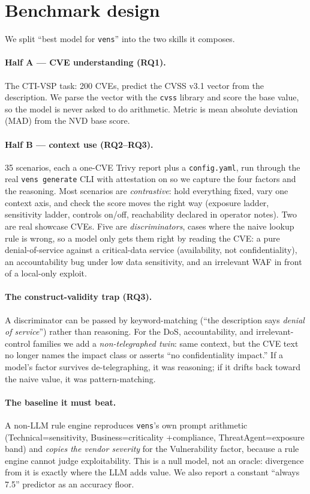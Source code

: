\documentclass[10pt,twocolumn]{article}
\newcommand{\code}[1]{\texttt{\small #1}}
\begin{document}
\section{Benchmark design}
\label{sec:design}
We split ``best model for \code{vens}'' into the two skills it composes.

\paragraph{Half A --- CVE understanding (RQ1).} The CTI-VSP task: 200 CVEs,
predict the CVSS v3.1 vector from the description. We parse the vector with the
\code{cvss} library and score the base value, so the model is never asked to do
arithmetic. Metric is mean absolute deviation (MAD) from the NVD base score.

\paragraph{Half B --- context use (RQ2--RQ3).} 35 scenarios, each a one-CVE
Trivy report plus a \code{config.yaml}, run through the real \code{vens generate}
CLI with attestation on so we capture the four factors and the reasoning. Most
scenarios are \emph{contrastive}: hold everything fixed, vary one context axis,
and check the score moves the right way (exposure ladder, sensitivity ladder,
controls on/off, reachability declared in operator notes). Two are real showcase
CVEs. Five are \emph{discriminators}, cases where the naive lookup rule is
wrong, so a model only gets them right by reading the CVE: a pure
denial-of-service against a critical-data service (availability, not
confidentiality), an accountability bug under low data sensitivity, and an
irrelevant WAF in front of a local-only exploit.

\paragraph{The construct-validity trap (RQ3).} A discriminator can be passed by
keyword-matching (``the description says \emph{denial of service}'') rather than
reasoning. For the DoS, accountability, and irrelevant-control families we add a
\emph{non-telegraphed twin}: same context, but the CVE text no longer names the
impact class or asserts ``no confidentiality impact.'' If a model's factor
survives de-telegraphing, it was reasoning; if it drifts back toward the naive
value, it was pattern-matching.

\paragraph{The baseline it must beat.} A non-LLM rule engine reproduces
\code{vens}'s own prompt arithmetic (Technical=sensitivity, Business=criticality
$+$compliance, ThreatAgent=exposure band) and \emph{copies the vendor severity}
for the Vulnerability factor, because a rule engine cannot judge exploitability.
This is a null model, not an oracle: divergence from it is exactly where the LLM
adds value. We also report a constant ``always 7.5'' predictor as an accuracy
floor.
\end{document}
